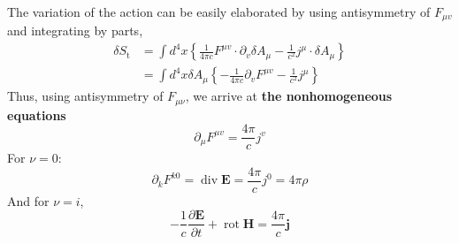 The variation of the action can be easily elaborated by using antisymmetry of $F_{\mu v}$ and integrating by parts,
\begin{equation}
\begin{aligned}
\delta S_{\mathrm{t}} &=\int d^{4} x\left\{\frac{1}{4 \pi c} F^{\mu v} \cdot \partial_{v} \delta A_{\mu}-\frac{1}{c^{2}} j^{\mu} \cdot \delta A_{\mu}\right\} \\
&=\int d^{4} x \delta A_{\mu}\left\{-\frac{1}{4 \pi c} \partial_{v} F^{\mu v}-\frac{1}{c^{2}} j^{\mu}\right\}
\end{aligned}
\end{equation}
Thus, using antisymmetry of $F_{\mu\nu}$, we arrive at \textbf{the nonhomogeneous equations}
\begin{equation}
\partial_{\mu} F^{\mu v}=\frac{4 \pi}{c} j^{v}
\end{equation}
For $\nu=0$:
\begin{equation}
\partial_{k} F^{k 0}=\operatorname{div} \mathbf{E}=\frac{4 \pi}{c} j^{0}=4 \pi \rho
\end{equation}
And for $\nu=i$,
\begin{equation}
-\frac{1}{c} \frac{\partial \mathbf{E}}{\partial t}+\operatorname{rot} \mathbf{H}=\frac{4 \pi}{c} \mathbf{j}
\end{equation}
